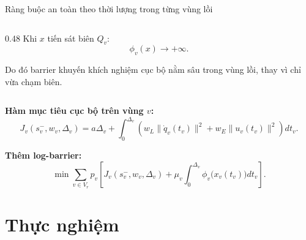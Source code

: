 \documentclass[aspectratio=169]{beamer}
\begin{document}
\begin{frame}{Ràng buộc an toàn theo thời lượng trong từng vùng lồi}
\begin{columns}[T, onlytextwidth]
\begin{column}{0.48\textwidth}
            Khi $x$ tiến sát biên $Q_v$:
            \[
                \phi_v(x)\to +\infty .
            \]

            \vspace{0.3em}
            Do đó barrier khuyến khích nghiệm cục bộ nằm sâu trong vùng lồi,
            thay vì chỉ vừa chạm biên.
        \end{column}
    \end{columns}

    \vspace{0.6em}

    \textbf{Hàm mục tiêu cục bộ trên vùng $v$:}
    \[
        J_v(s_v^-,w_v,\Delta_v)
        =
        a\Delta_v
        +
        \int_{0}^{\Delta_v}
        \left(
        w_L\|\dot q_v(t_v)\|^2
        +
        w_E\|u_v(t_v)\|^2
        \right)dt_v .
    \]

    \textbf{Thêm log-barrier:}
    \[
        \min
        \sum_{v\in V_r}
        p_v
        \left[
            J_v(s_v^-,w_v,\Delta_v)
            +
            \mu_v
            \int_{0}^{\Delta_v}
            \phi_v\!\bigl(x_v(t_v)\bigr)dt_v
            \right].
    \]

\end{frame}

\section{Thực nghiệm}
\end{document}
